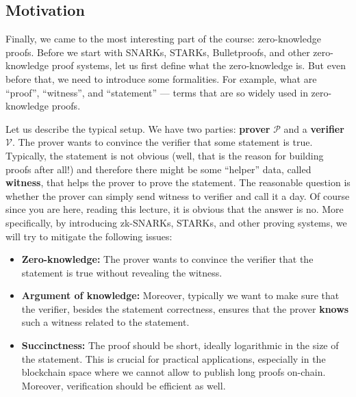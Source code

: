 \documentclass[../lecture-notes.tex]{subfiles}
\begin{document}
\subsection{Motivation}

Finally, we came to the most interesting part of the course: zero-knowledge proofs. Before we start with SNARKs, 
STARKs, Bulletproofs, and other zero-knowledge proof systems, let us first define what the zero-knowledge is. But even before 
that, we need to introduce some formalities. For example, what are ``proof'', ``witness'', and ``statement'' --- terms that are so widely used in zero-knowledge proofs.

Let us describe the typical setup. We have two parties: \textbf{prover} $\mathcal{P}$ and a \textbf{verifier} $\mathcal{V}$. The prover wants to convince the verifier that some statement is true. Typically, the statement is not obvious (well, that is the reason for building proofs after all!) and therefore there might be some ``helper'' data, called \textbf{witness}, that helps the prover to prove the statement. The reasonable question is whether the prover can simply send witness to verifier and call it a day. Of course since you are here, reading this lecture, it is obvious that the answer is no. More specifically, by introducing zk-SNARKs, STARKs, and other proving systems, we will try to mitigate the following issues:
\begin{itemize}
    \item \textbf{Zero-knowledge:} The prover wants to convince the verifier that the statement is true without revealing the witness. 
    \item \textbf{Argument of knowledge:} Moreover, typically we want to make sure that the verifier, besides the statement correctness, ensures that the prover \textbf{knows} such a witness related to the statement.
    \item \textbf{Succinctness:} The proof should be short, ideally logarithmic in the size of the statement. This is crucial for practical applications, especially in the blockchain space where we cannot allow to publish long proofs on-chain. Moreover, verification should be efficient as well.
\end{itemize}
\end{document}
